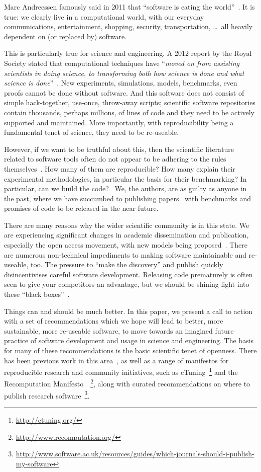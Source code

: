 \documentclass[conference]{IEEEtran}
\begin{document}
Marc Andreessen famously said in 2011 that ``software is eating the
world''~\cite{andreessen:2011}. It is true: we clearly live in a
computational world, with our everyday communications, entertainment,
shopping, security, transportation, \dots\ all heavily dependent on
(or replaced by) software.

This is particularly true for science and engineering. A 2012 report
by the Royal Society stated that computational techniques have
``{\emph{moved on from assisting scientists in doing science, to
transforming both how science is done and what science is
done}}''~\cite{rssaaoe:2012}. New experiments, simulations, models,
benchmarks, even proofs cannot be done without software. And this
software does not consist of simple hack-together, use-once,
throw-away scripts; scientific software repositories contain
thousands, perhaps millions, of lines of code and they need to be
actively supported and maintained. More importantly, with
reproducibility being a fundamental tenet of science, they need to be
re-useable.

However, if we want to be truthful about this, then the scientific
literature related to software tools often do not appear to be
adhering to the rules themselves~\cite{nature:2011}. How many of them are
reproducible? How many explain their experimental methodologies, in
particular the basis for their benchmarking? In particular, can we build the
code?~\cite{collberg-et-al:2014} We, the authors, are as guilty as
anyone in the past, where we have succumbed to publishing
papers~\cite{crick-et-al:2009,Berdine2011SLAyer} with benchmarks and
promises of code to be released in the near future.

There are many reasons why the wider scientific community is in this
state. We are experiencing significant changes in academic
dissemination and publication, especially the open access movement,
with new models being
proposed~\cite{stodden-et-al:2013,fursin+dubach:2014}.  There are
numerous non-technical impediments to making software maintainable and
re-useable, too. The pressure to ``make the discovery'' and publish
quickly disincentivises careful software development. Releasing
code prematurely is often seen to give your competitors an
advantage, but we should be shining light into these ``black
boxes''~\cite{morin-et-al:2012}.

Things can and should be much better. In this paper, we present a call
to action with a set of recommendations which we hope will lead to
better, more sustainable, more re-useable software, to move towards an
imagined future practice of software development and usage in science
and engineering.  The basis for many of these recommendations is the
basic scientific tenet of openness. There has been previous work in
this area~\cite{sim-et-al:2003,chirigati-et-al:2013}, as well as a
range of manifestos for reproducible research and community
initiatives, such as cTuning~\footnote{\url{http://ctuning.org/}} and
the Recomputation
Manifesto~\cite{gent:2013}~\footnote{\url{http://www.recomputation.org/}},
along with curated recommendations on where to publish research
software~\footnote{\url{http://www.software.ac.uk/resources/guides/which-journals-should-i-publish-my-software}}.
\end{document}

